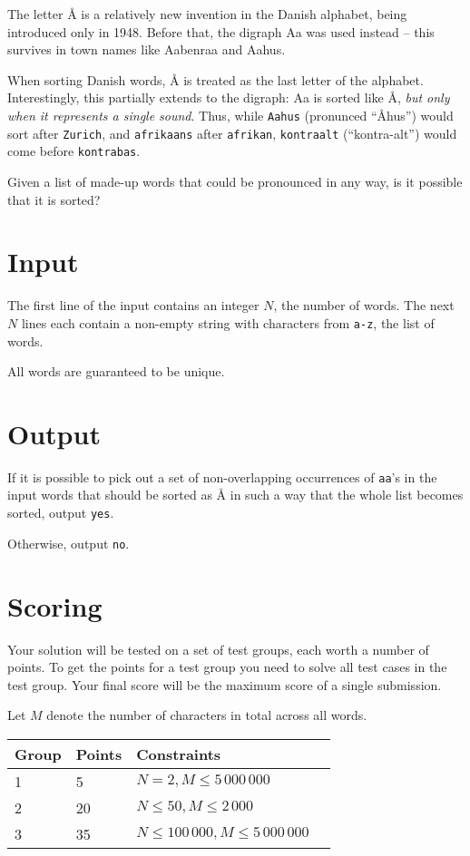 The letter Å is a relatively new invention in the Danish alphabet, being introduced only in 1948.
Before that, the digraph Aa was used instead -- this survives in town names like Aabenraa and Aahus.

When sorting Danish words, Å is treated as the last letter of the alphabet.
Interestingly, this partially extends to the digraph: Aa is sorted like Å,
\emph{but only when it represents a single sound}.
Thus, while \texttt{Aahus} (pronunced ``Åhus'') would sort after \texttt{Zurich},
and \texttt{afrikaans} after \texttt{afrikan},
\texttt{kontraalt} (``kontra-alt'') would come before \texttt{kontrabas}.

Given a list of made-up words that could be pronounced in any way, is it possible that it is sorted?

\section*{Input}
The first line of the input contains an integer $N$, the number of words.
The next $N$ lines each contain a non-empty string with characters from \texttt{a-z}, the list of words.

All words are guaranteed to be unique.

\section*{Output}
If it is possible to pick out a set of non-overlapping occurrences of \texttt{aa}'s in the input words that
should be sorted as Å in such a way that the whole list becomes sorted, output \texttt{yes}.

Otherwise, output \texttt{no}.

\section*{Scoring}
Your solution will be tested on a set of test groups, each worth a number of points.
To get the points for a test group you need to solve all test cases in the test group.
Your final score will be the maximum score of a single submission.

Let $M$ denote the number of characters in total across all words.

\noindent
\begin{tabular}{| l | l | l | l |}
\hline
Group & Points & Constraints \\ \hline
1     & 5      & $N = 2, M \le 5\,000\,000$ \\ \hline
2     & 20     & $N \le 50, M \le 2\,000$ \\ \hline
3     & 35     & $N \le 100\,000, M \le 5\,000\,000$ \\ \hline
\end{tabular}

